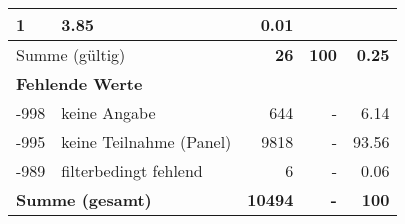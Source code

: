 \begin{longtable}{lXrrr}
       \num{1} &
       \num[round-mode=places,round-precision=2]{3.85} &
         \num[round-mode=places,round-precision=2]{0.01} \\
     \midrule
     \multicolumn{2}{l}{Summe (gültig)} &
       \textbf{\num{26}} &
     \textbf{\num{100}} &
       \textbf{\num[round-mode=places,round-precision=2]{0.25}} \\
     \multicolumn{5}{l}{\textbf{Fehlende Werte}}\\
       -998 &
       keine Angabe &
         \num{644} &
        - &
         \num[round-mode=places,round-precision=2]{6.14} \\
       -995 &
       keine Teilnahme (Panel) &
         \num{9818} &
        - &
         \num[round-mode=places,round-precision=2]{93.56} \\
       -989 &
       filterbedingt fehlend &
         \num{6} &
        - &
         \num[round-mode=places,round-precision=2]{0.06} \\
     \midrule
     \multicolumn{2}{l}{\textbf{Summe (gesamt)}} &
          \textbf{\num{10494}} &
        \textbf{-} &
        \textbf{\num{100}} \\
     \bottomrule
     \end{longtable}
     
